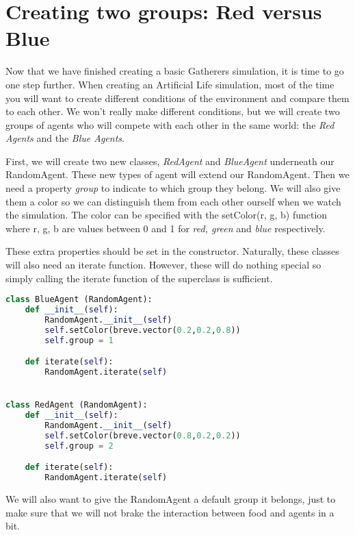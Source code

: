 \section{Creating two groups: Red versus Blue}
Now that we have finished creating a basic Gatherers simulation, it is time to go one step further. When creating an Artificial Life simulation, most of the time you will want to create different conditions of the environment and compare them to each other. We won't really make different conditions, but we will create two groups of agents who will compete with each other in the same world: the \textit{Red Agents} and the \textit{Blue Agents}.

First, we will create two new classes, \textit{RedAgent}  and \textit{BlueAgent} underneath our RandomAgent. These new types of agent will extend our RandomAgent. Then we need a property \textit{group} to indicate to which group they belong. We will also give them a color so we can distinguish them from each other ourself when we watch the simulation. The color can be specified with the setColor(r, g, b) function where r, g, b are values between 0 and 1 for \textit{red, green} and \textit{blue} respectively. 

These extra properties should be set in the constructor. Naturally, these classes will also need an iterate function. However, these will do nothing special so simply calling the iterate function of the superclass is sufficient. 


\begin{lstlisting}[language=Python]
class BlueAgent (RandomAgent):
	def __init__(self):
		RandomAgent.__init__(self)
		self.setColor(breve.vector(0.2,0.2,0.8))
		self.group = 1

	def iterate(self):
		RandomAgent.iterate(self)


class RedAgent (RandomAgent):
	def __init__(self):
		RandomAgent.__init__(self)
		self.setColor(breve.vector(0.8,0.2,0.2))
		self.group = 2

	def iterate(self):
		RandomAgent.iterate(self)
\end{lstlisting}

We will also want to give the RandomAgent a default group it belongs, just to make sure that we will not brake the interaction between food and agents in a bit.


